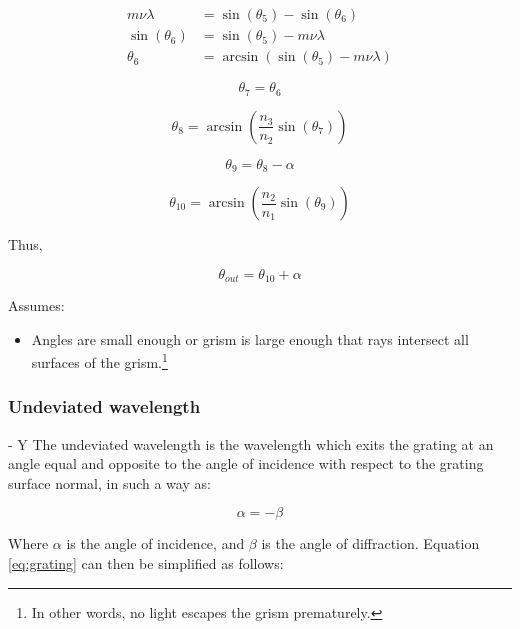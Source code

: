 \begin{align} 
m\nu\lambda &= \sin\left( \theta_5 \right) - \sin\left( \theta_6 \right) \\
\sin\left( \theta_6 \right) &= \sin\left(\theta_5 \right) - m\nu\lambda \\
\theta_6 &= \arcsin\left( \sin\left( \theta_5 \right) - m\nu\lambda \right)
\end{align}

\begin{equation}
\theta_7 = \theta_6
\end{equation}

\begin{equation}
\theta_8 = \arcsin\left( \frac{n_3}{n_2} \sin\left( \theta_7 \right) \right) 
\end{equation}

\begin{equation}
\theta_9 = \theta_8 - \alpha
\end{equation}

\begin{equation}
\theta_{10} = \arcsin\left( \frac{n_2}{n_1} \sin\left( \theta_9 \right) \right)
\end{equation}

Thus,

\begin{equation}
\boxed{\theta_{out} = \theta_{10} + \alpha}
\end{equation}

Assumes:
\begin{itemize}
    \item Angles are small enough or grism is large enough that rays intersect all surfaces of the grism.\footnote{In other words, no light escapes the grism prematurely.}
\end{itemize}

\subsubsection{Undeviated wavelength} - Y 
The undeviated wavelength is the wavelength which exits the grating at an angle equal and opposite to the angle of incidence with respect to the grating surface normal, in such a way as:

\begin{equation}
\alpha = -\beta
\end{equation}

Where $\alpha$ is the angle of incidence, and $\beta$ is the angle of diffraction. Equation \eqref{eq:grating} can then be simplified as follows:

